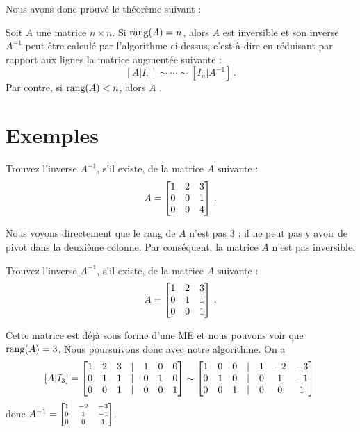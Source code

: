 Nous avons donc prouvé le théorème suivant :

\begin{theorem}
Soit $A$ une matrice $n \times n$.  Si $\textrm{rang}(A) = n$,
alors $A$ est inversible et son inverse $A^{-1}$ peut être calculé par l'algorithme ci-dessus, c'est-à-dire en réduisant par rapport aux lignes la matrice augmentée suivante :
$$
[A | I_n] \sim \cdots \sim [I_n | A^{-1}]\,.
$$
Par contre, si $\textrm{rang}(A) < n$, alors $A$ .
\end{theorem}

\newpage
\section{Exemples}

\begin{myprob} Trouvez l'inverse $A^{-1}$, s'il existe, de la matrice $A$ suivante :
$$
A = \left[ \begin{matrix} 1 & 2 & 3 \\ 0 & 0 & 1\\ 0 & 0 & 4 \end{matrix} \right] \,.
$$

\begin{mysol} Nous voyons directement que le rang de $A$ n'est pas 3 : il ne peut pas y avoir
de pivot dans la deuxième colonne.  Par conséquent, la matrice $A$ n'est pas inversible.
\end{mysol}\end{myprob}

\begin{myprob} Trouvez l'inverse $A^{-1}$, s'il existe, de la matrice $A$ suivante :
$$
A = \left[ \begin{matrix} 1 & 2 & 3 \\ 0 & 1 & 1\\ 0 & 0 & 1 \end{matrix} \right]\,.
$$

\begin{mysol} Cette matrice est déjà sous forme d'une ME et nous pouvons voir que $\textrm{rang}(A) = 3$.
Nous poursuivons donc avec notre algorithme. On a
$$
[A|I_3] = \left[ \begin{matrix} 1 & 2 & 3 &|&1&0&0\\ 0 & 1 & 1&|& 0&1&0\\ 0 & 0 & 1&|&0 & 0 & 1 \end{matrix} \right]
\sim
\left[ \begin{matrix} 
1 & 0 & 0 &|& 1 & -2 & -3\\ 
0 & 1 & 0 &|& 0 & 1 & -1\\ 
0 & 0 & 1 &|& 0 & 0 & 1 \end{matrix} \right]\,
$$
donc $A^{-1} = \scriptsize\left[ \begin{matrix} 1 & -2 & -3\\ 
 0 & 1 & -1\\ 
 0 & 0 & 1 \end{matrix} \right]$. \end{mysol}\end{myprob}

